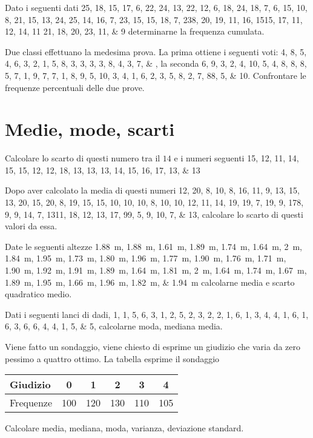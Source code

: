 \begin{esercizio}
Dato i seguenti dati \numlist{25; 18; 15; 17; 6; 22; 24; 13; 22; 12; 6; 18; 24; 18; 7; 6; 15; 10; 8; 21; 15; 13;
	24; 25; 14; 16; 7; 23; 15; 15; 18; 7; 23 8; 20; 19; 11; 16; 15 15; 17; 11; 12; 14; 11
	21; 18; 20; 23; 11; 9} determinarne la frequenza cumulata.
\end{esercizio}
\begin{esercizio}
	Due classi effettuano la medesima prova. La prima ottiene i seguenti voti: \numlist{4; 8; 5; 4; 6; 3; 2; 1; 5; 8; 3; 3; 3; 3; 8; 4; 3; 7;}, la seconda \numlist{6; 9; 3; 2; 4; 10; 5; 4; 8; 8; 8; 5; 7; 1; 9; 7; 7; 1; 8; 9; 5; 10; 3; 4; 1; 6; 2; 3; 5;
		8; 2; 7; 8 8; 5; 10}. Confrontare le frequenze percentuali delle due prove.
\end{esercizio} 
\section{Medie, mode, scarti}
\begin{esercizio}
	Calcolare lo scarto di questi numero tra il $14$ e i numeri seguenti \numlist{15; 12; 11; 14; 15; 15; 12; 12; 18; 13; 13; 13; 14; 15; 16; 17; 13; 13}
\end{esercizio}
\begin{esercizio}
	Dopo aver calcolato la media di questi numeri \numlist{12; 20; 8; 10; 8; 16; 11; 9; 13; 15; 13; 20; 15; 20; 8; 19; 15; 15; 10; 10; 10; 8;
		10; 10; 12; 11; 14; 19; 19; 7; 19; 9; 17 8; 9; 9; 14; 7; 13 11; 18; 12; 13; 17; 9 9; 5;
		9; 10; 7; 13}, calcolare lo scarto di questi valori da essa.
\end{esercizio}
\begin{esercizio}
	 Date le seguenti altezze \SIlist{1.88; 1.88; 1.61; 1.89; 1.74; 1.64; 2; 1.84; 1.95; 1.73; 1.80; 1.96; 1.77; 1.90; 1.76; 1.71; 1.90;
		1.92; 1.91; 1.89; 1.64; 1.81; 2; 1.64; 1.74; 1.67; 1.89; 1.95; 1.66; 1.96; 1.82; 1.94}{\m} calcolarne media e scarto quadratico medio.
\end{esercizio}
\begin{esercizio}
Dati i seguenti lanci di dadi, \numlist{1; 1; 5; 6; 3; 1; 2; 5; 2; 3; 2; 2; 1; 6; 1; 3; 4; 4; 1; 6; 1; 6; 3; 6; 6; 4; 4; 1; 5; 5}, calcolarne moda, mediana media.
\end{esercizio}
\begin{esercizio}
	
	\item Viene fatto un sondaggio, viene chiesto di esprime un giudizio che varia da zero pessimo a quattro ottimo. La tabella esprime il sondaggio
	\begin{center}
		\begin{tabular}{l*{5} {S[table-format=3.0]}}
			{Giudizio}	&0 &1 &2 &3&4 \\
			\midrule 
			{Frequenze}	& 100 &120 & 130 & 110&105 \\ 
		\end{tabular}
	\end{center} Calcolare media, mediana, moda, varianza, deviazione standard.
\end{esercizio}

